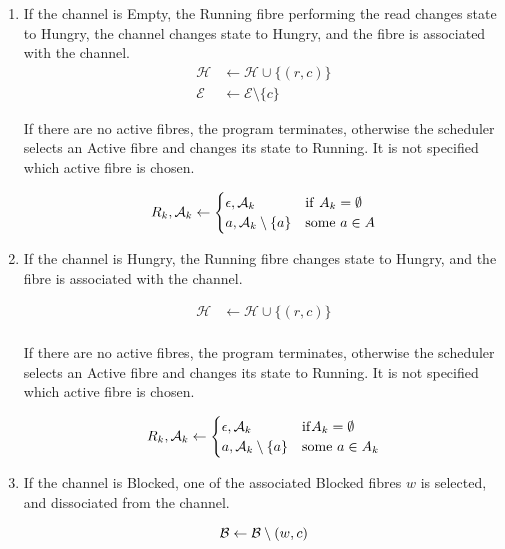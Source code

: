 \documentclass[oneside]{book}
\begin{document}
\begin{enumerate}
\item If the channel is Empty, the Running fibre performing the read
changes state to Hungry, the channel changes state to Hungry,
and the fibre is associated with the channel.
\begin{align}
{\mathcal H}&\leftarrow {\mathcal H} \cup \{(r,c)\}\\
{\mathcal E} &\leftarrow {\mathcal E} \setminus \{c\}
\end{align}

If there are no active fibres, the program terminates,
otherwise the scheduler selects an Active fibre and
changes its state to Running.  It is not specified which active 
fibre is chosen.

\begin{equation}
R_k,{\mathcal A_k} \leftarrow
\begin{cases}
\epsilon,{\mathcal A_k}& {\rm if\ } A_k=\emptyset \\
a,{\mathcal A_k} \setminus \{a\} & {\rm some\ } a\in A
\end{cases}
\end{equation}


\item If the channel is Hungry, the Running fibre changes state
to Hungry, and the fibre is associated with the channel.

\begin{align}
{\mathcal H}&\leftarrow {\mathcal H} \cup \{(r,c)\}\\
\end{align}

If there are no active fibres, the program terminates,
otherwise the scheduler selects an Active fibre and
changes its state to Running.  It is not specified which active 
fibre is chosen.

\begin{equation}
R_k,{\mathcal A_k} \leftarrow
\begin{cases}
\epsilon,{\mathcal A_k}& {\rm if} A_k=\emptyset \\
a,{\mathcal A_k} \setminus \{a\} & {\rm some\ } a\in A_k
\end{cases}
\end{equation}


\item If the channel is Blocked, one of the associated Blocked fibres $w$
is selected, and dissociated from the channel. 

\begin{equation}
{\mathcal B} \leftarrow {\mathcal B}\setminus (w,c)\\ 
\end{equation}


\end{enumerate}
\end{document}

